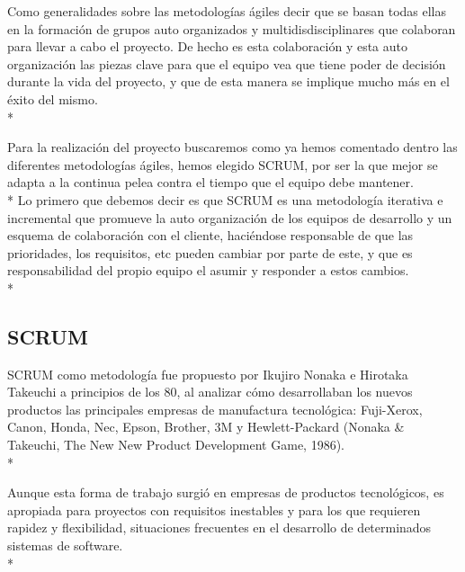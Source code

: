 \documentclass[../pfc.tex]{subfiles}
\begin{document}
	Como generalidades sobre las metodologías ágiles decir que se basan todas ellas en la formación de grupos auto organizados y multidisdisciplinares que colaboran para llevar a cabo el proyecto. De hecho es esta colaboración y esta auto organización las piezas clave para que el equipo vea que tiene poder de decisión durante la vida del proyecto, y que de esta manera se implique mucho más en el éxito del mismo.\\*
	
	Para la realización del proyecto buscaremos como ya hemos comentado dentro las diferentes metodologías ágiles, hemos elegido SCRUM, por ser la que mejor se adapta a la continua pelea contra el tiempo que el equipo debe mantener. \\*
	Lo primero que debemos decir es que SCRUM es una metodología iterativa e incremental que promueve la auto organización de los equipos de desarrollo y un esquema de colaboración con el cliente, haciéndose responsable de que las prioridades, los requisitos, etc pueden cambiar por parte de este, y que es responsabilidad del propio equipo el asumir y responder a estos cambios. \\*
	
	\subsection{SCRUM}
	
	SCRUM como metodología fue propuesto por Ikujiro Nonaka e Hirotaka Takeuchi a principios de los 80, al analizar cómo desarrollaban los nuevos productos las principales empresas de manufactura tecnológica: Fuji-Xerox, Canon, Honda, Nec, Epson, Brother, 3M y Hewlett-Packard (Nonaka \& Takeuchi, The New New Product Development Game, 1986).\\*
	
	Aunque esta forma de trabajo surgió en empresas de productos tecnológicos, es apropiada para proyectos con requisitos inestables y para los que requieren rapidez y flexibilidad, situaciones frecuentes en el desarrollo de determinados sistemas de software.\\*
	
\end{document}
